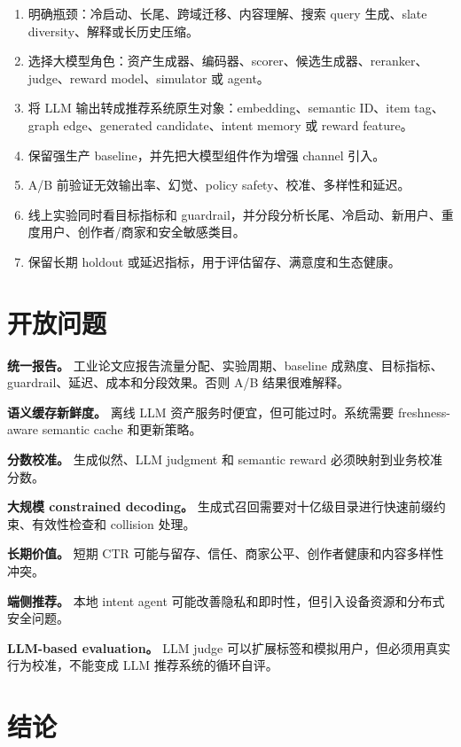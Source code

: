 \documentclass[UTF8,fontset=fandol,11pt]{ctexart}
\begin{document}
\begin{enumerate}
  \item 明确瓶颈：冷启动、长尾、跨域迁移、内容理解、搜索 query 生成、slate diversity、解释或长历史压缩。
  \item 选择大模型角色：资产生成器、编码器、scorer、候选生成器、reranker、judge、reward model、simulator 或 agent。
  \item 将 LLM 输出转成推荐系统原生对象：embedding、semantic ID、item tag、graph edge、generated candidate、intent memory 或 reward feature。
  \item 保留强生产 baseline，并先把大模型组件作为增强 channel 引入。
  \item A/B 前验证无效输出率、幻觉、policy safety、校准、多样性和延迟。
  \item 线上实验同时看目标指标和 guardrail，并分段分析长尾、冷启动、新用户、重度用户、创作者/商家和安全敏感类目。
  \item 保留长期 holdout 或延迟指标，用于评估留存、满意度和生态健康。
\end{enumerate}

\section{开放问题}

\textbf{统一报告。} 工业论文应报告流量分配、实验周期、baseline 成熟度、目标指标、guardrail、延迟、成本和分段效果。否则 A/B 结果很难解释。

\textbf{语义缓存新鲜度。} 离线 LLM 资产服务时便宜，但可能过时。系统需要 freshness-aware semantic cache 和更新策略。

\textbf{分数校准。} 生成似然、LLM judgment 和 semantic reward 必须映射到业务校准分数。

\textbf{大规模 constrained decoding。} 生成式召回需要对十亿级目录进行快速前缀约束、有效性检查和 collision 处理。

\textbf{长期价值。} 短期 CTR 可能与留存、信任、商家公平、创作者健康和内容多样性冲突。

\textbf{端侧推荐。} 本地 intent agent 可能改善隐私和即时性，但引入设备资源和分布式安全问题。

\textbf{LLM-based evaluation。} LLM judge 可以扩展标签和模拟用户，但必须用真实行为校准，不能变成 LLM 推荐系统的循环自评。

\section{结论}
\end{document}
